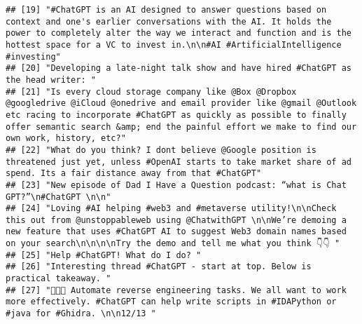 \documentclass[
]{article}
\begin{document}
\begin{verbatim}
## [19] "#ChatGPT is an AI designed to answer questions based on context and one's earlier conversations with the AI. It holds the power to completely alter the way we interact and function and is the hottest space for a VC to invest in.\n\n#AI #ArtificialIntelligence #investing"                                
## [20] "Developing a late-night talk show and have hired #ChatGPT as the head writer: "                                                                                                                                                                                                                                
## [21] "Is every cloud storage company like @Box @Dropbox @googledrive @iCloud @onedrive and email provider like @gmail @Outlook etc racing to incorporate #ChatGPT as quickly as possible to finally offer semantic search &amp; end the painful effort we make to find our own work, history, etc?"                  
## [22] "What do you think? I dont believe @Google position is threatened just yet, unless #OpenAI starts to take market share of ad spend. Its a fair distance away from that #ChatGPT"                                                                                                                                
## [23] "New episode of Dad I Have a Question podcast: “what is Chat GPT?”\n#ChatGPT \n\n"                                                                                                                                                                                                                              
## [24] "Loving #AI helping #web3 and #metaverse utility!\n\nCheck this out from @unstoppableweb using @ChatwithGPT \n\nWe’re demoing a  new feature that uses #ChatGPT AI to suggest Web3 domain names based on your search\n\n\n\nTry the demo and tell me what you think 👇👇 "                                      
## [25] "Help #ChatGPT! What do I do? "                                                                                                                                                                                                                                                                                 
## [26] "Interesting thread #ChatGPT - start at top. Below is practical takeaway. "                                                                                                                                                                                                                                     
## [27] "👩🏿‍💻 Automate reverse engineering tasks. We all want to work more effectively. #ChatGPT can help write scripts in #IDAPython or #java for #Ghidra. \n\n12/13 "                                                                                                                                               

\end{verbatim}
\end{document}
